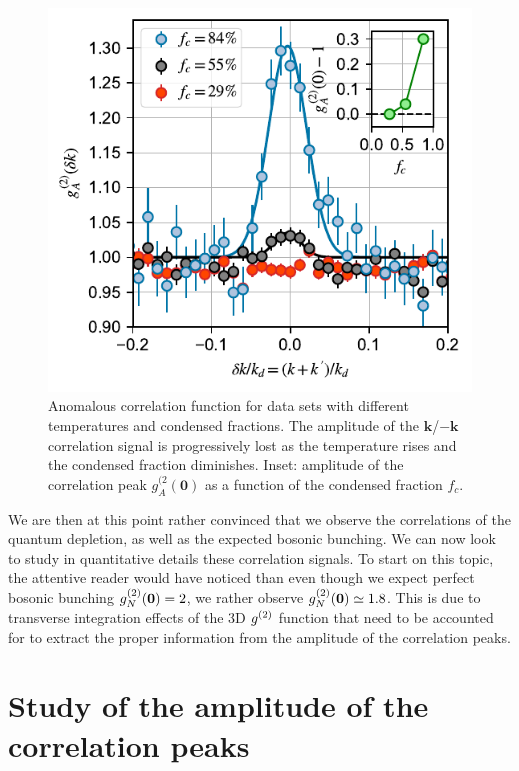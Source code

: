 \begin{figure}
    \centering
    \includegraphics{Fig/Chapter4/kmk_3_temp_errorbars.pdf}
    \caption{Anomalous correlation function for data sets with different temperatures and condensed fractions. The amplitude of the $\bm{k}$/$-\bm{k}$ correlation signal is progressively lost as the temperature rises and the condensed fraction diminishes. Inset: amplitude of the correlation peak $g^{(2}_{A}({\bm 0})$ as a function of the condensed fraction $f_c$.}
    \label{fig:kmk_3_temp}
\end{figure}

We are then at this point rather convinced that we observe the \kmk correlations of the quantum depletion, as well as the expected bosonic bunching. We can now look to study in quantitative details these correlation signals. To start on this topic, the attentive reader would have noticed than even though we expect perfect bosonic bunching $g^{(2)}_N (\bm{0})=2$, we rather observe $g^{(2)}_N (\bm{0}) \simeq 1.8$. This is due to transverse integration effects of the 3D $g^{(2)}$ function that need to be accounted for to extract the proper information from the amplitude of the correlation peaks.

\section{Study of the amplitude of the correlation peaks}


